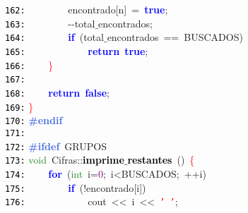 \documentclass[a4paper,10pt]{scrartcl}
\begin{document}
{   \mbox{}\texttt{\textcolor{Black}{162:}} \ \ \ \ \ \ \ \ encontrado\textcolor{BrickRed}{[}n\textcolor{BrickRed}{]}\ \textcolor{BrickRed}{=}\ \textbf{\textcolor{Blue}{true}}\textcolor{BrickRed}{;} \\
   \mbox{}\texttt{\textcolor{Black}{163:}} \ \ \ \ \ \ \ \ \textcolor{BrickRed}{-\/-}total$\_$encontrados\textcolor{BrickRed}{;} \\
   \mbox{}\texttt{\textcolor{Black}{164:}} \ \ \ \ \ \ \ \ \textbf{\textcolor{Blue}{if}}\ \textcolor{BrickRed}{(}total$\_$encontrados\ \textcolor{BrickRed}{==}\ BUSCADOS\textcolor{BrickRed}{)} \\
   \mbox{}\texttt{\textcolor{Black}{165:}} \ \ \ \ \ \ \ \ \ \ \ \ \textbf{\textcolor{Blue}{return}}\ \textbf{\textcolor{Blue}{true}}\textcolor{BrickRed}{;} \\
   \mbox{}\texttt{\textcolor{Black}{166:}} \ \ \ \ \textcolor{Red}{\}} \\
   \mbox{}\texttt{\textcolor{Black}{167:}} \ \  \\
   \mbox{}\texttt{\textcolor{Black}{168:}} \ \ \ \ \textbf{\textcolor{Blue}{return}}\ \textbf{\textcolor{Blue}{false}}\textcolor{BrickRed}{;} \\
   \mbox{}\texttt{\textcolor{Black}{169:}} \textcolor{Red}{\}} \\
   \mbox{}\texttt{\textcolor{Black}{170:}} \textbf{\textcolor{RoyalBlue}{\#endif}} \\
   \mbox{}\texttt{\textcolor{Black}{171:}}  \\
   \mbox{}\texttt{\textcolor{Black}{172:}} \textbf{\textcolor{RoyalBlue}{\#ifdef}}\ GRUPOS \\
   \mbox{}\texttt{\textcolor{Black}{173:}} \textcolor{ForestGreen}{void}\ Cifras\textcolor{BrickRed}{::}\textbf{\textcolor{Black}{imprime$\_$restantes}}\ \textcolor{BrickRed}{()}\ \textcolor{Red}{\{} \\
   \mbox{}\texttt{\textcolor{Black}{174:}} \ \ \ \ \textbf{\textcolor{Blue}{for}}\ \textcolor{BrickRed}{(}\textcolor{ForestGreen}{int}\ i\textcolor{BrickRed}{=}\textcolor{Purple}{0}\textcolor{BrickRed}{;}\ i\textcolor{BrickRed}{\textless{}}BUSCADOS\textcolor{BrickRed}{;}\ \textcolor{BrickRed}{++}i\textcolor{BrickRed}{)} \\
   \mbox{}\texttt{\textcolor{Black}{175:}} \ \ \ \ \ \ \ \ \textbf{\textcolor{Blue}{if}}\ \textcolor{BrickRed}{(!}encontrado\textcolor{BrickRed}{[}i\textcolor{BrickRed}{])} \\
   \mbox{}\texttt{\textcolor{Black}{176:}} \ \ \ \ \ \ \ \ \ \ \ \ cout\ \textcolor{BrickRed}{\textless{}\textless{}}\ i\ \textcolor{BrickRed}{\textless{}\textless{}}\ \texttt{\textcolor{Red}{'\ '}}\textcolor{BrickRed}{;} \\
}
\end{document}
